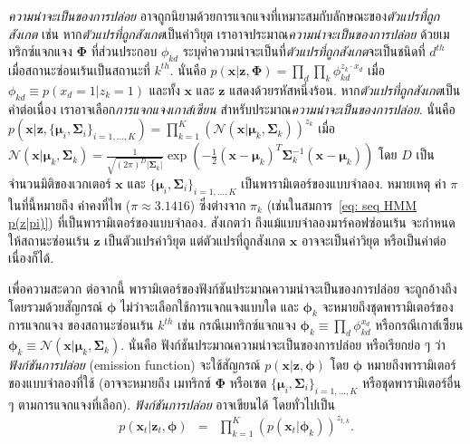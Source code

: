 \textit{ความน่าจะเป็นของการปล่อย}
อาจถูกนิยามด้วยการแจกแจงที่เหมาะสมกับลักษณะของ\textit{ตัวแปรที่ถูกสังเกต}
เช่น 
หาก\textit{ตัวแปรที่ถูกสังเกต}เป็นค่าวิยุต 
เราอาจประมาณ\textit{ความน่าจะเป็นของการปล่อย} ด้วยเมทริกซ์แจกแจง $\bm{\Phi}$ ที่ส่วนประกอบ $\phi_{kd}$ 
ระบุค่าความน่าจะเป็นที่\textit{ตัวแปรที่ถูกสังเกต}จะเป็นชนิดที่ $d^{th}$ เมื่อสถานะซ่อนเร้นเป็นสถานะที่ $k^{th}$.
นั่นคือ $p(\bm{x}|\bm{z}, \bm{\Phi}) = \prod_d \prod_k \phi_{kd}^{z_k \cdot x_d}$
เมื่อ
$\phi_{kd} \equiv p(x_d = 1|z_k =1)$
และทั้ง $\bm{x}$ และ $\bm{z}$ แสดงด้วยรหัสหนึ่งร้อน.
%
หาก\textit{ตัวแปรที่ถูกสังเกต}เป็นค่าต่อเนื่อง 
เราอาจเลือก\textit{การแจกแจงเกาส์เซียน} 
สำหรับประมาณ\textit{ความน่าจะเป็นของการปล่อย}.
นั่นคือ 
$p(\bm{x}|\bm{z}, \{\bm{\mu}_i, \bm{\Sigma}_i\}_{i=1,\ldots,K}) = \prod_{k=1}^K \left(\mathcal{N}(\bm{x}|\bm{\mu}_k, \bm{\Sigma}_k)\right)^{z_k}$
เมื่อ $\mathcal{N}(\bm{x}|\bm{\mu}_k, \bm{\Sigma}_k) = \frac{1}{ \sqrt{ (2\pi)^D | \bm{\Sigma}_k |} } \exp \left( -\frac{1}{2}  (\bm{x} -\bm{\mu}_k)^T \bm{\Sigma}_k^{-1} (\bm{x} -\bm{\mu}_k) \right)$
โดย $D$ เป็นจำนวนมิติของเวกเตอร์ $\bm{x}$
และ $\{\bm{\mu}_i, \bm{\Sigma}_i\}_{i=1,\ldots,K}$ เป็นพารามิเตอร์ของแบบจำลอง.
หมายเหตุ ค่า $\pi$ ในที่นี้หมายถึง ค่าคงที่ไพ ($\pi \approx 3.1416$) ซึ่งต่างจาก $\pi_k$ (เช่นในสมการ~\ref{eq: seq HMM p(z|pi)}) ที่เป็นพารามิเตอร์ของแบบจำลอง.
สังเกตว่า ถึงแม้แบบจำลองมาร์คอฟซ่อนเร้น จะกำหนดให้สถานะซ่อนเร้น $\bm{z}$ เป็นตัวแปรค่าวิยุต
แต่ตัวแปรที่ถูกสังเกต $\bm{x}$ อาจจะเป็นค่าวิยุต หรือเป็นค่าต่อเนื่องก็ได้.

เพื่อความสะดวก ต่อจากนี้ พารามิเตอร์ของฟังก์ชันประมาณความน่าจะเป็นของการปล่อย จะถูกอ้างถึงโดยรวมด้วยสัญกรณ์ $\bm{\phi}$ ไม่ว่าจะเลือกใช้การแจกแจงแบบใด และ $\bm{\phi}_k$ จะหมายถึงชุดพารามิเตอร์ของการแจกแจง ของสถานะซ่อนเร้น $k^{th}$
เช่น กรณีเมทริกซ์แจกแจง $\bm{\phi}_k \equiv \prod_d \phi_{kd}^{x_d}$
หรือกรณีเกาส์เซีียน $\bm{\phi}_k \equiv \mathcal{N}(\bm{x}|\bm{\mu}_k, \bm{\Sigma}_k)$.
นั่นคือ ฟังก์ชันประมาณความน่าจะเป็นของการปล่อย หรือเรียกย่อ ๆ ว่า \textit{ฟังก์ชันการปล่อย} (emission function)
จะใช้สัญกรณ์ $p(\bm{x}|\bm{z}, \bm{\phi})$ โดย $\bm{\phi}$ หมายถึงพารามิเตอร์ของแบบจำลองที่ใช้ (อาจจะหมายถึง เมทริกซ์ $\bm{\Phi}$ หรือเซต $\{\bm{\mu}_i, \bm{\Sigma}_i\}_{i=1,\ldots,K}$ หรือชุดพารามิเตอร์อื่น ๆ ตามการแจกแจงที่เลือก).
\textit{ฟังก์ชันการปล่อย} อาจเขียนได้ โดยทั่วไปเป็น
\begin{eqnarray}
p(\bm{x}_t|\bm{z}_t, \bm{\phi}) &=& \prod_{k=1}^K \left( p(\bm{x}_t| \bm{\phi}_k ) \right)^{z_{t,k}}
\label{eq: seq HMM emission} .
\end{eqnarray}
 
